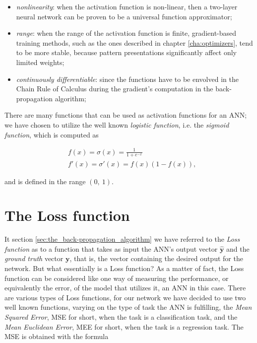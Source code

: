 		\begin{itemize}
			\item \textit{nonlinearity}: when the activation function is non-linear, then a two-layer neural
			network can be proven to be a universal function approximator;
			\item \textit{range}: when the range of the activation function is finite, gradient-based training
			methods, such as the ones described in chapter \ref{cha:optimizers}, tend to be more stable, because
			pattern presentations significantly affect only limited weights;
			\item \textit{continuously differentiable}: since the functions have to be envolved in the Chain Rule
			of Calculus during the gradient's computation in the back-propagation algorithm;
		\end{itemize}

		There are many functions that can be used as activation functions for an ANN; we have chosen to utilize the
		well known \textit{logistic function}, i.e. the \textit{sigmoid function}, which is computed as

		\begin{align*}
		    &f(x) = \sigma(x) = \frac{1}{1 + e^{-x}} \\
		    &f'(x) = \sigma'(x) = f(x)(1 - f(x)),
		\end{align*}

		and is defined in the range $\left ( 0,\ 1 \right )$.


	\section{The Loss function} %
	\label{sec:the_loss_function}
		It section \ref{sec:the_back-propagation_algorithm} we have referred to the \textit{Loss function} as to a
		function that takes as input the ANN's output vector $\hat{\mathbf{y}}$ and the \textit{ground truth}
		vector $\mathbf{y}$, that is, the vector containing the desired output for the network. But what
		essentially is a Loss function? As a matter of fact, the Loss function can be considered like
		one way of measuring the performance, or equivalently the error, of the model that utilizes it, an ANN in
		this case. There are various types of Loss functions, for our network we have decided to use two well
		known functions, varying on the type of task the ANN is fulfilling, the \textit{Mean Squared Error}, MSE
		for short, when the task is a classification task, and the \textit{Mean Euclidean Error}, MEE for short,
		when the task is a regression task. The MSE is obtained with the formula

